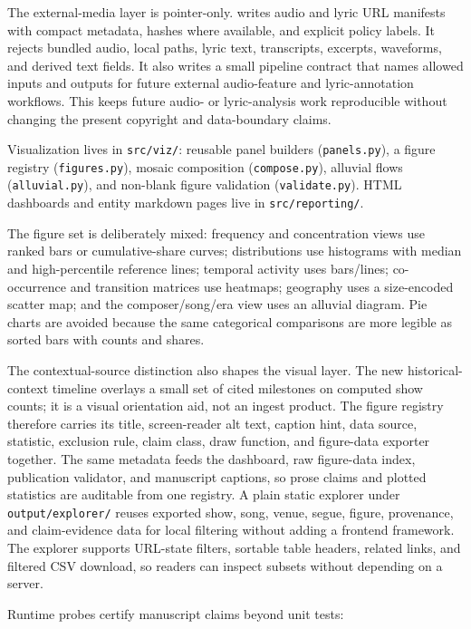 \documentclass[
]{article}
\begin{document}
The external-media layer is pointer-only.
 writes audio and lyric URL manifests
with compact metadata, hashes where available, and explicit policy
labels. It rejects bundled audio, local paths, lyric text, transcripts,
excerpts, waveforms, and derived text fields. It also writes a small
pipeline contract that names allowed inputs and outputs for future
external audio-feature and lyric-annotation workflows. This keeps future
audio- or lyric-analysis work reproducible without changing the present
copyright and data-boundary claims.

Visualization lives in \texttt{src/viz/}: reusable panel builders
(\texttt{panels.py}), a figure registry (\texttt{figures.py}), mosaic
composition (\texttt{compose.py}), alluvial flows
(\texttt{alluvial.py}), and non-blank figure validation
(\texttt{validate.py}). HTML dashboards and entity markdown pages live
in \texttt{src/reporting/}.

The figure set is deliberately mixed: frequency and concentration views
use ranked bars or cumulative-share curves; distributions use histograms
with median and high-percentile reference lines; temporal activity uses
bars/lines; co-occurrence and transition matrices use heatmaps;
geography uses a size-encoded scatter map; and the composer/song/era
view uses an alluvial diagram. Pie charts are avoided because the same
categorical comparisons are more legible as sorted bars with counts and
shares.

The contextual-source distinction also shapes the visual layer. The new
historical-context timeline overlays a small set of cited milestones on
computed show counts; it is a visual orientation aid, not an ingest
product. The figure registry therefore carries its title, screen-reader
alt text, caption hint, data source, statistic, exclusion rule, claim
class, draw function, and figure-data exporter together. The same
metadata feeds the dashboard, raw figure-data index, publication
validator, and manuscript captions, so prose claims and plotted
statistics are auditable from one registry. A plain static explorer
under \texttt{output/explorer/} reuses exported show, song, venue,
segue, figure, provenance, and claim-evidence data for local filtering
without adding a frontend framework. The explorer supports URL-state
filters, sortable table headers, related links, and filtered CSV
download, so readers can inspect subsets without depending on a server.

Runtime probes certify manuscript claims beyond unit tests:
\end{document}
